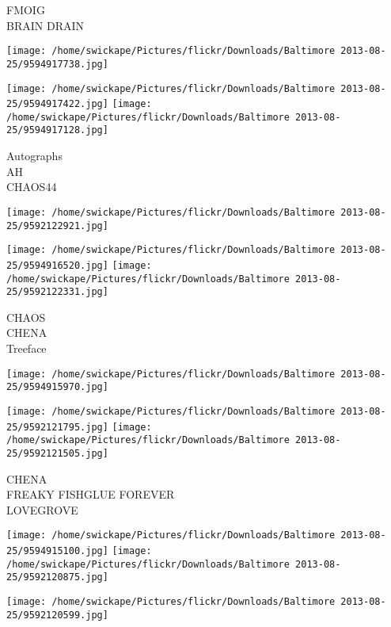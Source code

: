 \documentclass[10pt,letterpaper]{article}
\begin{document}
FMOIG\\
BRAIN DRAIN\\
\pagebreak

\texttt{[image: /home/swickape/Pictures/flickr/Downloads/Baltimore 2013-08-25/9594917738.jpg]}

\vspace{0.25in}
\texttt{[image: /home/swickape/Pictures/flickr/Downloads/Baltimore 2013-08-25/9594917422.jpg]}
\texttt{[image: /home/swickape/Pictures/flickr/Downloads/Baltimore 2013-08-25/9594917128.jpg]}

Autographs\\
AH\\
CHAOS44\\
\pagebreak

\texttt{[image: /home/swickape/Pictures/flickr/Downloads/Baltimore 2013-08-25/9592122921.jpg]}

\vspace{0.25in}
\texttt{[image: /home/swickape/Pictures/flickr/Downloads/Baltimore 2013-08-25/9594916520.jpg]}
\texttt{[image: /home/swickape/Pictures/flickr/Downloads/Baltimore 2013-08-25/9592122331.jpg]}

CHAOS\\
CHENA\\
Treeface\\
\pagebreak

\texttt{[image: /home/swickape/Pictures/flickr/Downloads/Baltimore 2013-08-25/9594915970.jpg]}

\vspace{0.25in}
\texttt{[image: /home/swickape/Pictures/flickr/Downloads/Baltimore 2013-08-25/9592121795.jpg]}
\texttt{[image: /home/swickape/Pictures/flickr/Downloads/Baltimore 2013-08-25/9592121505.jpg]}

CHENA\\
FREAKY FISHGLUE FOREVER\\
LOVEGROVE\\
\pagebreak

\texttt{[image: /home/swickape/Pictures/flickr/Downloads/Baltimore 2013-08-25/9594915100.jpg]}
\texttt{[image: /home/swickape/Pictures/flickr/Downloads/Baltimore 2013-08-25/9592120875.jpg]}

\texttt{[image: /home/swickape/Pictures/flickr/Downloads/Baltimore 2013-08-25/9592120599.jpg]}
\end{document}

